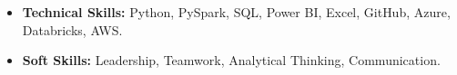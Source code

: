 \begin{itemize}[leftmargin=*]
  \item \textbf{Technical Skills:} Python, PySpark, SQL, Power BI, Excel, GitHub, Azure, Databricks, AWS.
  \item \textbf{Soft Skills:} Leadership, Teamwork, Analytical Thinking, Communication.
\end{itemize}
